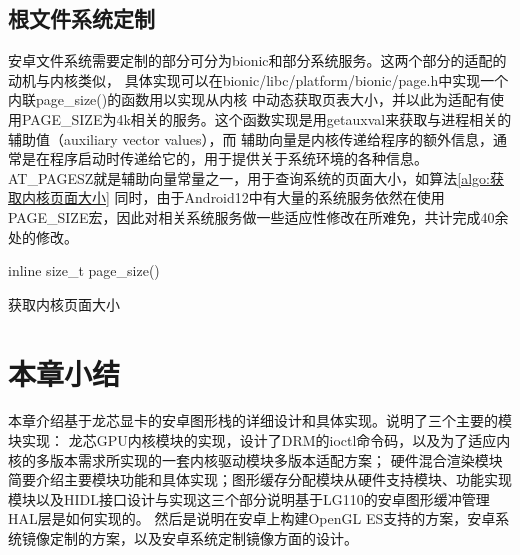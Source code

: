 \subsection{根文件系统定制}
安卓文件系统需要定制的部分可分为bionic和部分系统服务。这两个部分的适配的动机与内核类似，
具体实现可以在bionic/libc/platform/bionic/page.h中实现一个内联page\_size()的函数用以实现从内核
中动态获取页表大小，并以此为适配有使用PAGE\_SIZE为4k相关的服务。这个函数实现是用getauxval来获取与进程相关的辅助值（auxiliary vector values），而
辅助向量是内核传递给程序的额外信息，通常是在程序启动时传递给它的，用于提供关于系统环境的各种信息。AT\_PAGESZ就是辅助向量常量之一，用于查询系统的页面大小，如算法\ref{algo:获取内核页面大小}
同时，由于Android12中有大量的系统服务依然在使用PAGE\_SIZE宏，因此对相关系统服务做一些适应性修改在所难免，共计完成40余处的修改。
\begin{algorithm}
  \SetAlgoLined
  inline size\_t page\_size(){\\
  }
  \caption{获取内核页面大小}
  \label{algo:获取内核页面大小}
\end{algorithm}


\section{本章小结}
本章介绍基于龙芯显卡的安卓图形栈的详细设计和具体实现。说明了三个主要的模块实现：
龙芯GPU内核模块的实现，设计了DRM的ioctl命令码，以及为了适应内核的多版本需求所实现的一套内核驱动模块多版本适配方案；
硬件混合渲染模块简要介绍主要模块功能和具体实现；图形缓存分配模块从硬件支持模块、功能实现模块以及HIDL接口设计与实现这三个部分说明基于LG110的安卓图形缓冲管理HAL层是如何实现的。
然后是说明在安卓上构建OpenGL ES支持的方案，安卓系统镜像定制的方案，以及安卓系统定制镜像方面的设计。

